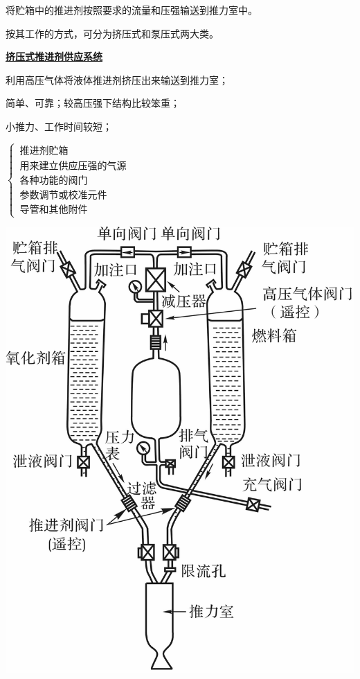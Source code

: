 \blue[功能]\quad 将贮箱中的推进剂按照要求的流量和压强输送到推力室中。

\blue[分类]\quad 按其工作的方式，可分为挤压式和泵压式两大类。
\vspace*{0.5em}

\clearpage
\begin{minipage}{0.5\linewidth}
	\noindent \textbf{\underline{挤压式推进剂供应系统}}
	
	\blue[原理]\quad 利用高压气体将液体推进剂挤压出来输送到推力室；
	
	\blue[优缺点]\quad 简单、可靠；较高压强下结构比较笨重；
	
	\blue[适用性]\quad 小推力、工作时间较短；
	\vspace*{0.8em}
	
	\blue[组成]  \quad 
	$
	\begin{cases}
		\, \mbox{推进剂贮箱}\\
		\, \mbox{用来建立供应压强的气源}\\
		\, \mbox{各种功能的阀门}\\
		\, \mbox{参数调节或校准元件}\\
		\, \mbox{导管和其他附件}
	\end{cases}
	$
\end{minipage}
\begin{minipage}{0.5\linewidth}
	\centering
	\includegraphics[width=0.8\linewidth]{pic/气压.png}
\end{minipage}



